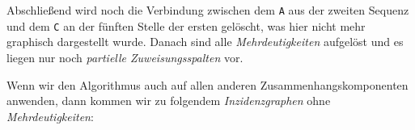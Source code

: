 \begin{center}
\end{center}

Abschließend wird noch die Verbindung zwischen dem \texttt{A} aus der zweiten Sequenz und dem \texttt{C} an der fünften Stelle der ersten gelöscht, was hier nicht mehr graphisch dargestellt wurde. Danach sind alle \emph{Mehrdeutigkeiten} aufgelöst und es liegen nur noch \emph{partielle Zuweisungsspalten} vor.

Wenn wir den Algorithmus auch auf allen anderen Zusammenhangskomponenten anwenden, dann kommen wir zu folgendem \emph{Inzidenzgraphen} ohne \emph{Mehrdeutigkeiten}:
 
